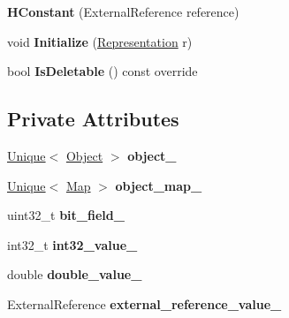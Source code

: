 \begin{DoxyCompactItemize}
\item 
{\bfseries H\+Constant} (External\+Reference reference)\hypertarget{classv8_1_1internal_1_1_h_constant_a2ebdb9f20818db1822135bb555bfe67a}{}\label{classv8_1_1internal_1_1_h_constant_a2ebdb9f20818db1822135bb555bfe67a}

\item 
void {\bfseries Initialize} (\hyperlink{classv8_1_1internal_1_1_representation}{Representation} r)\hypertarget{classv8_1_1internal_1_1_h_constant_ab376b7cc567724d47014ae4bb0c9b256}{}\label{classv8_1_1internal_1_1_h_constant_ab376b7cc567724d47014ae4bb0c9b256}

\item 
bool {\bfseries Is\+Deletable} () const  override\hypertarget{classv8_1_1internal_1_1_h_constant_a565b50b9b50e7599203da778d64bb5a4}{}\label{classv8_1_1internal_1_1_h_constant_a565b50b9b50e7599203da778d64bb5a4}

\end{DoxyCompactItemize}
\subsection*{Private Attributes}
\begin{DoxyCompactItemize}
\item 
\hyperlink{classv8_1_1internal_1_1_unique}{Unique}$<$ \hyperlink{classv8_1_1internal_1_1_object}{Object} $>$ {\bfseries object\+\_\+}\hypertarget{classv8_1_1internal_1_1_h_constant_afd85a1c916cfe78904bfdcfb7941dcc7}{}\label{classv8_1_1internal_1_1_h_constant_afd85a1c916cfe78904bfdcfb7941dcc7}

\item 
\hyperlink{classv8_1_1internal_1_1_unique}{Unique}$<$ \hyperlink{classv8_1_1internal_1_1_map}{Map} $>$ {\bfseries object\+\_\+map\+\_\+}\hypertarget{classv8_1_1internal_1_1_h_constant_ae1aa3a8f4874c5c2d8d5a06490e184a9}{}\label{classv8_1_1internal_1_1_h_constant_ae1aa3a8f4874c5c2d8d5a06490e184a9}

\item 
uint32\+\_\+t {\bfseries bit\+\_\+field\+\_\+}\hypertarget{classv8_1_1internal_1_1_h_constant_ae2443c6a190c33c42745dd4d57589c8f}{}\label{classv8_1_1internal_1_1_h_constant_ae2443c6a190c33c42745dd4d57589c8f}

\item 
int32\+\_\+t {\bfseries int32\+\_\+value\+\_\+}\hypertarget{classv8_1_1internal_1_1_h_constant_a7a3489f7a897d549c90e6a32a2cc67eb}{}\label{classv8_1_1internal_1_1_h_constant_a7a3489f7a897d549c90e6a32a2cc67eb}

\item 
double {\bfseries double\+\_\+value\+\_\+}\hypertarget{classv8_1_1internal_1_1_h_constant_af8038703ea537864e90238fcb5bcb22d}{}\label{classv8_1_1internal_1_1_h_constant_af8038703ea537864e90238fcb5bcb22d}

\item 
External\+Reference {\bfseries external\+\_\+reference\+\_\+value\+\_\+}\hypertarget{classv8_1_1internal_1_1_h_constant_a36f113463a6b6d31e2e4569fed179837}{}\label{classv8_1_1internal_1_1_h_constant_a36f113463a6b6d31e2e4569fed179837}

\end{DoxyCompactItemize}
